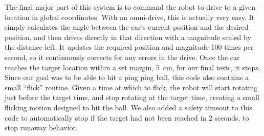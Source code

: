 \documentclass[letterpaper, 11pt]{article}
\begin{document}
\begin{enumerate}[label=\textbf{\arabic*.}]
The final major part of this system is to command the robot to drive to a given location in global coordinates. With an omni-drive, this is actually very easy. It simply calculates the angle between the car's current position and the desired position, and then drives directly in that direction with a magnitude scaled by the distance left. It updates the required position and magnitude 100 times per second, so it continuously corrects for any errors in the drive. Once the car reaches the target location within a set margin, \SI{5}{\centi\meter}, for our final tests, it stops. Since our goal was to be able to hit a ping ping ball, this code also contains a small ``flick'' routine. Given a time at which to flick, the robot will start rotating just before the target time, and stop rotating at the target time, creating a small flicking motion designed to hit the ball. We also added a safety timeout to this code to automatically stop if the target had not been reached in 2 seconds, to stop runaway behavior.

\begin{mdframed}[backgroundcolor=bg]
    \inputminted[breaklines]{c}{files/excerpts/goToTarget.c}
\end{mdframed}


\end{enumerate}
\end{document}
